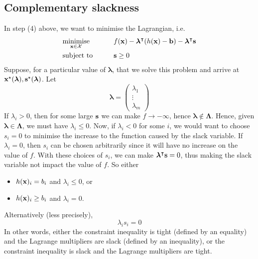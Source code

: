 \subsection{Complementary slackness}
In step (4) above, we want to minimise the Lagrangian, i.e.
\begin{alignat*}{2}
	 & \underset{\vb x \in \mathcal X}{\text{minimise}} & \qquad & f(\vb x) - \bm \lambda^\intercal (h(\vb x) - \vb b) - \bm \lambda^\intercal \vb s \\
	 & \text{subject to}                                &        & \vb s \geq 0
\end{alignat*}
Suppose, for a particular value of \(\bm \lambda\), that we solve this problem and arrive at \(\vb x^\star(\bm \lambda), \vb s^\star(\bm \lambda)\).
Let
\[
	\bm \lambda = \begin{pmatrix}
		\lambda_1 \\ \vdots \\ \lambda_m
	\end{pmatrix}
\]
If \(\lambda_i > 0\), then for some large \(\vb s\) we can make \(f \to -\infty\), hence \(\bm \lambda \notin \bm \Lambda\).
Hence, given \(\bm \lambda \in \bm \Lambda\), we must have \(\lambda_i \leq 0\).
Now, if \(\lambda_i < 0\) for some \(i\), we would want to choose \(s_i = 0\) to minimise the increase to the function caused by the slack variable.
If \(\lambda_i = 0\), then \(s_i\) can be chosen arbitrarily since it will have no increase on the value of \(f\).
With these choices of \(s_i\), we can make \(\bm \lambda^\intercal \vb s = 0\), thus making the slack variable not impact the value of \(f\).
So either
\begin{itemize}
	\item \(h(\vb x)_i = b_i\) and \(\lambda_i \leq 0\), or
	\item \(h(\vb x)_i \geq b_i\) and \(\lambda_i = 0\).
\end{itemize}
Alternatively (less precisely),
\[
	\lambda_i s_i = 0
\]
In other words, either the constraint inequality is tight (defined by an equality) and the Lagrange multipliers are slack (defined by an inequality), or the constraint inequality is slack and the Lagrange multipliers are tight.

